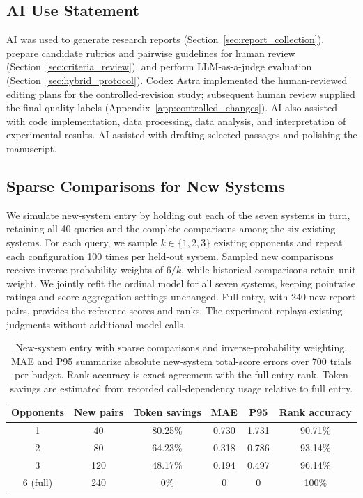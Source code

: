 \documentclass{article}
\begin{document}
\subsection*{AI Use Statement}
AI was used to generate research reports (Section~\ref{sec:report_collection}), prepare candidate rubrics and pairwise guidelines for human review (Section~\ref{sec:criteria_review}), and perform LLM-as-a-judge evaluation (Section~\ref{sec:hybrid_protocol}). Codex Astra implemented the human-reviewed editing plans for the controlled-revision study; subsequent human review supplied the final quality labels (Appendix~\ref{app:controlled_changes}). AI also assisted with code implementation, data processing, data analysis, and interpretation of experimental results. AI assisted with drafting selected passages and polishing the manuscript.

\subsection{Sparse Comparisons for New Systems}
\label{app:new_system_sampling}
We simulate new-system entry by holding out each of the seven systems in turn, retaining all 40 queries and the complete comparisons among the six existing systems. For each query, we sample $k\in\{1,2,3\}$ existing opponents and repeat each configuration 100 times per held-out system. Sampled new comparisons receive inverse-probability weights of $6/k$, while historical comparisons retain unit weight. We jointly refit the ordinal model for all seven systems, keeping pointwise ratings and score-aggregation settings unchanged. Full entry, with 240 new report pairs, provides the reference scores and ranks. The experiment replays existing judgments without additional model calls.

\begin{table}[t]
\centering
\small
\setlength{\tabcolsep}{5pt}


\begin{tabular}{@{}cccccc@{}}
\toprule
Opponents & New pairs & Token savings & MAE & P95 & Rank accuracy \\
\midrule
1 & 40 & 80.25\% & 0.730 & 1.731 & 90.71\% \\
2 & 80 & 64.23\% & 0.318 & 0.786 & 93.14\% \\
3 & 120 & 48.17\% & 0.194 & 0.497 & 96.14\% \\
6 (full) & 240 & 0\% & 0 & 0 & 100\% \\
\bottomrule
\end{tabular}
\caption{New-system entry with sparse comparisons and inverse-probability weighting. MAE and P95 summarize absolute new-system total-score errors over 700 trials per budget. Rank accuracy is exact agreement with the full-entry rank. Token savings are estimated from recorded call-dependency usage relative to full entry.}
\label{tab:new_system_sampling}
\end{table}
\end{document}
